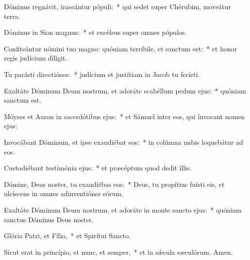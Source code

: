\item Dóminus regnávit, irascántur pópuli:~* qui sedet super Chérubim, moveátur terra.

\item Dóminus in Sion magnus:~* et excélsus super omnes pópulos.

\item Confiteántur nómini tuo magno: quóniam terríbile, et sanctum est:~* et honor regis judícium díligit.

\item Tu parásti directiónes:~* judícium et justítiam in Jacob tu fecísti.

\item Exaltáte Dóminum Deum nostrum, et adoráte scabéllum pedum ejus:~* quóniam sanctum est.

\item Móyses et Aaron in sacerdótibus ejus:~* et Sámuel inter eos, qui ínvocant nomen ejus:

\item Invocábant Dóminum, et ipse exaudiébat eos:~* in colúmna nubis loquebátur ad eos.

\item Custodiébant testimónia ejus:~* et præcéptum quod dedit illis.

\item Dómine, Deus noster, tu exaudiébas eos:~* Deus, tu propítius fuísti eis, et ulcíscens in omnes adinventiónes eórum.

\item Exaltáte Dóminum Deum nostrum, et adoráte in monte sancto ejus:~* quóniam sanctus Dóminus Deus noster.

\item Glória Patri, et Fílio,~* et Spirítui Sancto.

\item Sicut erat in princípio, et nunc, et semper,~* et in sǽcula sæculórum. Amen.

